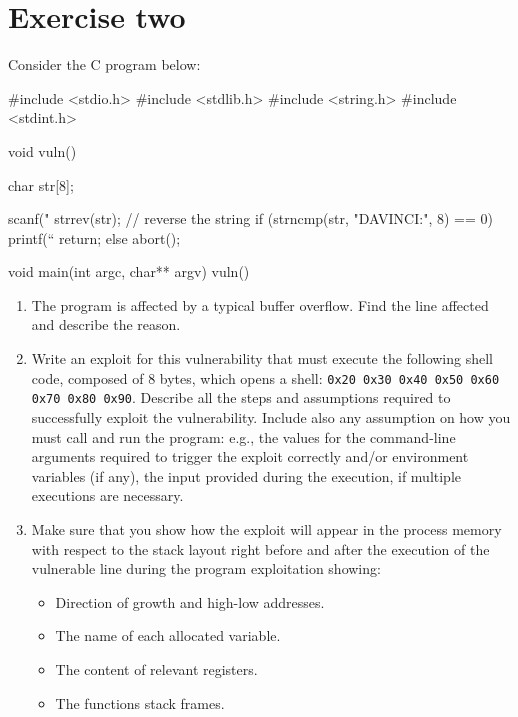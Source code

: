 \section{Exercise two}

Consider the C program below:
\begin{verbnobox}[\verbarg]
#include <stdio.h>
#include <stdlib.h>
#include <string.h>
#include <stdint.h>

void vuln() {
    char str[8];

    scanf("%
    strrev(str); // reverse the string
    if (strncmp(str, "DAVINCI:", 8) == 0) {
        printf(“%
        return;
    }
    else
        abort();
}

void main(int argc, char** argv) {
    vuln()
}
\end{verbnobox}
\begin{enumerate}
    \item The program is affected by a typical buffer overflow. 
        Find the line affected and describe the reason. 
    \item Write an exploit for this vulnerability that must execute the following shell code, composed of 8 bytes, which opens a shell: \texttt{0x20 0x30 0x40 0x50 0x60 0x70 0x80 0x90}.
        Describe all the steps and assumptions required to successfully exploit the vulnerability. 
        Include also any assumption on how you must call and run the program: e.g., the values for the command-line arguments required to trigger the exploit correctly and/or environment variables (if any), the input provided during the execution, if multiple executions are necessary. 
    \item Make sure that you show how the exploit will appear in the process memory with respect to the stack layout right before and after the execution of the vulnerable line during the program exploitation showing:
        \begin{itemize}
            \item Direction of growth and high-low addresses.
            \item The name of each allocated variable.
            \item The content of relevant registers.
            \item The functions stack frames.
        \end{itemize}
\end{enumerate}

